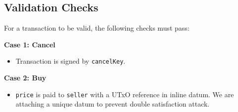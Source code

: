 \documentclass{article}
\begin{document}
\subsection{Validation Checks}

For a transaction to be valid, the following checks must pass:

\textbf{Case 1: Cancel}
\begin{itemize}
  \item Transaction is signed by \verb|cancelKey|.
\end{itemize}


\textbf{Case 2: Buy}
\begin{itemize}
  \item \verb|price| is paid to \verb|seller| with a UTxO reference in inline datum.
        We are attaching a unique datum to prevent double satisfaction attack.
\end{itemize}
\end{document}
